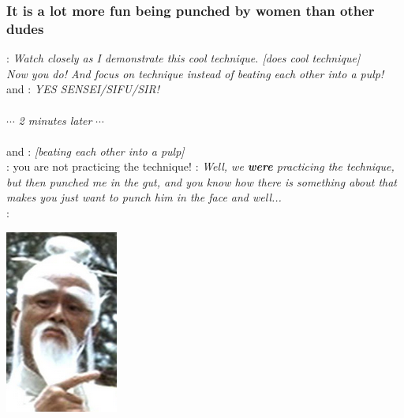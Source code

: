 \newpage
{}

\subsubsection*{It is a lot more fun being punched by women than other dudes}
\begin{scene*}
: \textit{Watch closely as I demonstrate this cool technique. [does cool technique]\\
Now you do! And focus on technique instead of beating each other into a pulp!}\\
\dude and \dudetwo: \textit{YES SENSEI/SIFU/SIR!}\\
\paragraph{}
$\cdots$ \textit{2 minutes later} $\cdots$\\
\paragraph{}
\dude and \dudetwo: \textit{[beating each other into a pulp]}\\
: you are not practicing the technique!
\dude: \textit{Well, we \textbf{were} practicing the technique, but then \dudetwo punched me in the gut, and you know how there is something about \dudetwo that makes you just want to punch him in the face and well...}\\

:
\begin{center}
\includegraphics[scale=0.5]{01-Intro/concerned-sifu}
\end{center}
\end{scene*}

